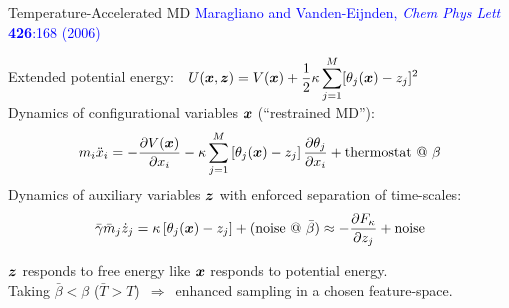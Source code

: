 \begin{frame}[fragile]{Temperature-Accelerated MD}
\vspace{-5mm}
\textcolor{blue}{\tiny Maragliano and Vanden-Eijnden, {\it Chem Phys Lett} {\bf 
426}:168 (2006)}

Extended potential energy:\ \ $\displaystyle U({\boldsymbol x},{\boldsymbol z}) = V({\boldsymbol x}) + 
\frac{1}{2}\kappa\sum_{j=1}^{M}[\theta_j({\boldsymbol x})-z_j]^2$\\
Dynamics of configurational variables ${\boldsymbol x}$ (``restrained MD''):
\begin{displaymath}
m_i\ddot{x}_i = -\frac{\partial V({\boldsymbol x})}{\partial 
x_i}-\kappa\sum_{j=1}^{M}\left[\theta_j({\boldsymbol x})-z_j\right]\frac{\partial\theta_j}{
\partial x_i}+\mbox{thermostat @ $\beta$}
\end{displaymath}
Dynamics of auxiliary variables ${\boldsymbol z}$ with enforced separation of time-scales:
\begin{displaymath}
\bar\gamma\bar{m}_j\dot{z}_j = \kappa\left[\theta_j({\boldsymbol x})-z_j\right] + 
(\mbox{noise @ $\bar\beta$}) \approx -\frac{\partial F_{\kappa}}{\partial z_j} + 
\mbox{noise}
\end{displaymath}

${\boldsymbol z}$ responds to free energy like ${\boldsymbol x}$ responds to potential energy.\\
Taking $\bar\beta < \beta$ ($\bar{T} > T$)\ $\Rightarrow$\ enhanced sampling in 
a chosen feature-space.

\end{frame}

